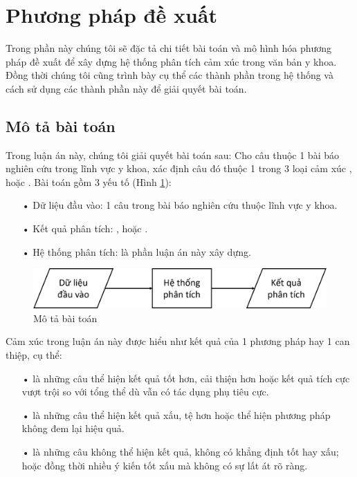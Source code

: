 \section{Phương pháp đề xuất}	\label{sec:phuongphapdexuat}
Trong phần này chúng tôi sẽ đặc tả chi tiết bài toán và mô hình hóa phương pháp đề xuất để xây dựng hệ thống phân tích cảm xúc trong văn bản y khoa. Đồng thời chúng tôi cũng trình bày cụ thể các thành phần trong hệ thống và cách sử dụng các thành phần này để giải quyết bài toán.
\subsection{Mô tả bài toán}
Trong luận án này, chúng tôi giải quyết bài toán sau:
Cho câu thuộc 1 bài báo nghiên cứu trong lĩnh vực y khoa, xác định câu đó thuộc 1 trong 3 loại cảm xúc \tichcuc, \tieucuc hoặc \trungtinh. Bài toán gồm 3 yếu tố (Hình \ref{fig:mo-ta-bai-toan}):
\begin{itemize}[noitemsep]
\item[•] Dữ liệu đầu vào: 1 câu trong bài báo nghiên cứu thuộc lĩnh vực y khoa.
\item[•] Kết quả phân tích: \tichcuc, \tieucuc hoặc \trungtinh.
\item[•] Hệ thống phân tích: là phần luận án này xây dựng.
\end{itemize}
\begin{figure}
\centering
\includegraphics[scale=0.35]{../hinh/mo_ta_bai_toan.png}
\caption{Mô tả bài toán} \label{fig:mo-ta-bai-toan}
\end{figure}
Cảm xúc trong luận án này được hiểu như kết quả của 1 phương pháp hay 1 can thiệp, cụ thể:
\begin{itemize}
\item[•] \tichcuc là những câu thể hiện kết quả tốt hơn, cải thiện hơn hoặc kết quả tích cực vượt trội so với tổng thể dù vẫn có tác dụng phụ tiêu cực.\\
\item[•] \tieucuc là những câu thể hiện kết quả xấu, tệ hơn hoặc thể hiện phương pháp không đem lại hiệu quả.\\
\item[•] \trungtinh là những câu không thể hiện kết quả, không có khẳng định tốt hay xấu; hoặc đồng thời nhiều ý kiến tốt xấu mà không có sự lất át rõ ràng.\\
\end{itemize}

